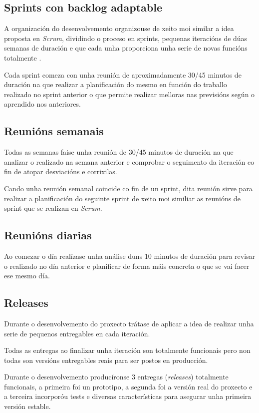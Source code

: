     \subsection{Sprints con backlog adaptable}
    A organización do desenvolvemento organizouse de xeito moi similar a idea 
proposta en \emph{Scrum}, dividindo o proceso en sprints, pequenas iteracións 
de dúas semanas de duración e que cada unha proporciona unha serie de novas 
funcións totalmente .

    Cada sprint comeza con unha reunión de aproximadamente 30/45 minutos de 
duración na que realizar a planificación do mesmo en función do 
traballo realizado no sprint anterior o que permite realizar melloras nas 
previsións según o aprendido nos anteriores.

    \subsection{Reunións semanais}
    Todas as semanas faise unha reunión de 30/45 minutos de duración na que 
analizar o realizado na semana anterior e comprobar o seguimento da iteración 
co fin de atopar desviacións e corrixilas.

    Cando unha reunión semanal coincide co fin de un sprint, dita reunión 
sirve para realizar a planificación do seguinte sprint de xeito moi similiar as 
reunións de sprint que se realizan en \emph{Scrum}.

    \subsection{Reunións diarias}
    Ao comezar o día realízase unha análise duns 10 minutos de duración para 
revisar o realizado no día anterior e planificar de forma máis concreta o que 
se vai facer ese mesmo día.

    \subsection{Releases}
    Durante o desenvolvemento do proxecto trátase de aplicar a idea de realizar 
unha serie de pequenos entregables en cada iteración.
    
    Todas as entregas ao finalizar unha iteración son totalmente funcionais 
pero non todas son versións entregables reais para ser postos en producción.

    Durante o desenvolvemento producíronse 3 entregas (\emph{releases}) 
totalmente %
 funcionais, a primeira foi un prototipo, a segunda foi a versión 
real do proxecto e a terceira incorporóu tests e diversas características para 
asegurar unha primeira versión estable.

